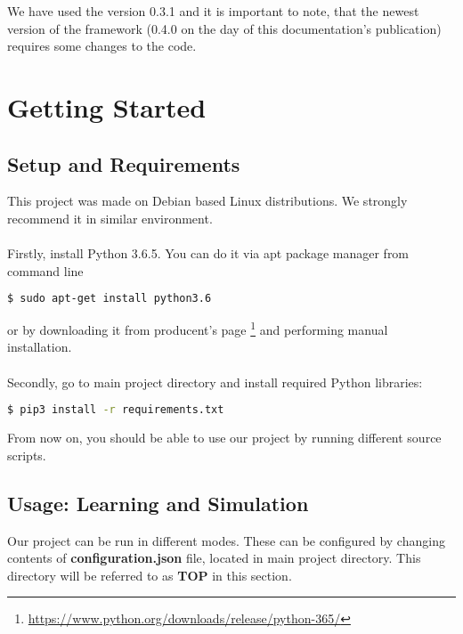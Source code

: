 \documentclass{article}
\begin{document}
We have used the version 0.3.1 and it is important to note, that the newest version of the framework (0.4.0 on the day of this documentation's publication) requires some changes to the code.
\section{Getting Started}
\subsection{Setup and Requirements}
This project was made on Debian based Linux distributions. We strongly 
recommend it in similar environment. 
\\\\
Firstly, install Python 3.6.5. You can do it via apt package manager from command line
\begin{lstlisting}[language=bash]
$ sudo apt-get install python3.6 
\end{lstlisting}
or by downloading it from producent's page
\footnote{\url{https://www.python.org/downloads/release/python-365/}}
 and performing manual installation.
\\ \\ 
Secondly, go to main project directory and install required Python libraries:
\begin{lstlisting}[language=bash]
$ pip3 install -r requirements.txt
\end{lstlisting}
From now on, you should be able to use our project by running different source scripts.

\subsection{Usage: Learning and Simulation}
Our project can be run in different modes. These can be configured by changing contents of 
\textbf{configuration.json} file, located in main project directory. This directory will be referred to as 
\textbf{TOP} in this section.
\end{document}
